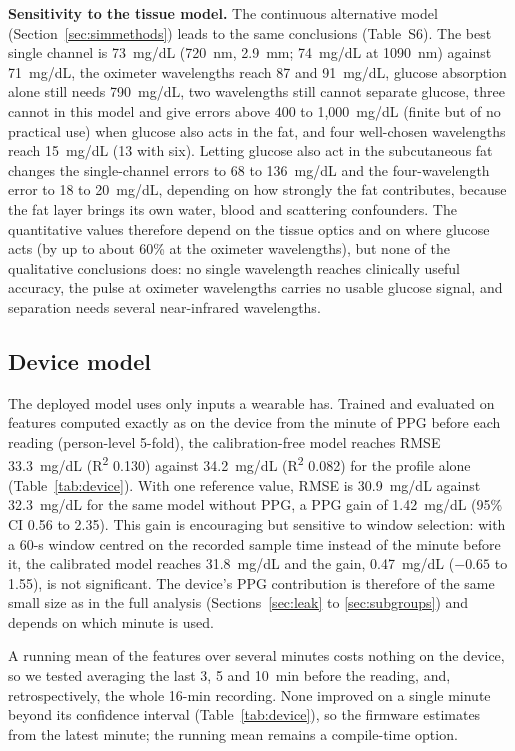 \documentclass[11pt]{article}
\newcommand{\RR}{R\textsuperscript{2}}
\newcommand{\mgdl}{mg/dL}
\begin{document}
\textbf{Sensitivity to the tissue model.} The continuous alternative model (Section~\ref{sec:simmethods}) leads to the same conclusions (Table~S6). The best single channel is 73~\mgdl{} (720~nm, 2.9~mm; 74~\mgdl{} at 1090~nm) against 71~\mgdl{}, the oximeter wavelengths reach 87 and 91~\mgdl{}, glucose absorption alone still needs 790~\mgdl{}, two wavelengths still cannot separate glucose, three cannot in this model and give errors above 400 to 1,000~\mgdl{} (finite but of no practical use) when glucose also acts in the fat, and four well-chosen wavelengths reach 15~\mgdl{} (13 with six). Letting glucose also act in the subcutaneous fat changes the single-channel errors to 68 to 136~\mgdl{} and the four-wavelength error to 18 to 20~\mgdl{}, depending on how strongly the fat contributes, because the fat layer brings its own water, blood and scattering confounders. The quantitative values therefore depend on the tissue optics and on where glucose acts (by up to about 60\% at the oximeter wavelengths), but none of the qualitative conclusions does: no single wavelength reaches clinically useful accuracy, the pulse at oximeter wavelengths carries no usable glucose signal, and separation needs several near-infrared wavelengths.


\FloatBarrier
\subsection{Device model}
\label{sec:device}
The deployed model uses only inputs a wearable has. Trained and evaluated on features computed exactly as on the device from the minute of PPG before each reading (person-level 5-fold), the calibration-free model reaches RMSE 33.3~\mgdl{} (\RR{} 0.130) against 34.2~\mgdl{} (\RR{} 0.082) for the profile alone (Table~\ref{tab:device}). With one reference value, RMSE is 30.9~\mgdl{} against 32.3~\mgdl{} for the same model without PPG, a PPG gain of 1.42~\mgdl{} (95\% CI 0.56 to 2.35). This gain is encouraging but sensitive to window selection: with a 60-s window centred on the recorded sample time instead of the minute before it, the calibrated model reaches 31.8~\mgdl{} and the gain, 0.47~\mgdl{} ($-0.65$ to 1.55), is not significant. The device's PPG contribution is therefore of the same small size as in the full analysis (Sections~\ref{sec:leak} to \ref{sec:subgroups}) and depends on which minute is used.

A running mean of the features over several minutes costs nothing on the device, so we tested averaging the last 3, 5 and 10~min before the reading, and, retrospectively, the whole 16-min recording. None improved on a single minute beyond its confidence interval (Table~\ref{tab:device}), so the firmware estimates from the latest minute; the running mean remains a compile-time option.
\end{document}
